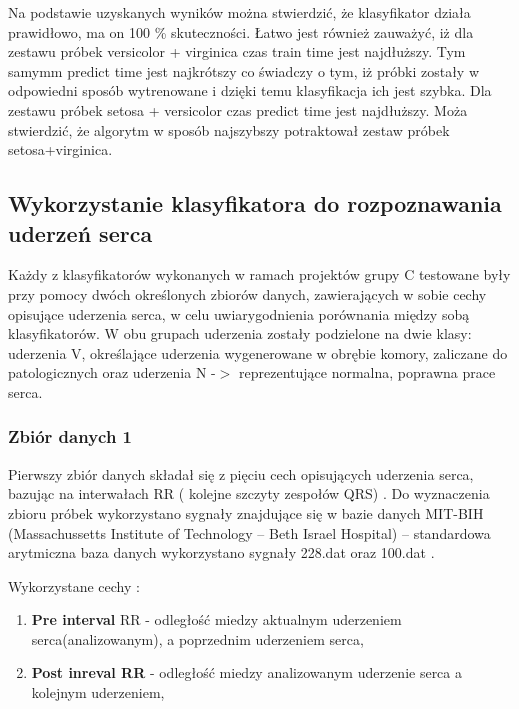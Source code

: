 \documentclass[11pt]{article}
\begin{document}
\begin{enumerate}
\noindent Na podstawie uzyskanych wyników można stwierdzić, że klasyfikator działa prawidłowo, ma on 100 \% skuteczności. Łatwo jest również zauważyć, iż dla zestawu próbek versicolor +  virginica czas train time jest najdłuższy. Tym samymm predict time jest najkrótszy co świadczy o tym, iż próbki zostały w odpowiedni sposób wytrenowane i dzięki temu klasyfikacja ich jest szybka. Dla zestawu próbek setosa + versicolor czas predict time jest najdłuższy. Moża stwierdzić, że algorytm w sposób najszybszy potraktował zestaw próbek setosa+virginica. 

\noindent 

\noindent 

\subsection{Wykorzystanie klasyfikatora do rozpoznawania uderzeń serca}

\noindent Każdy z klasyfikatorów wykonanych w ramach projektów grupy C testowane były przy pomocy dwóch określonych zbiorów danych, zawierających w sobie cechy opisujące uderzenia serca, w celu uwiarygodnienia porównania między sobą klasyfikatorów. W obu grupach uderzenia zostały podzielone na dwie klasy: uderzenia V, określające uderzenia wygenerowane w obrębie komory, zaliczane do patologicznych oraz uderzenia N -$>$ reprezentujące normalna, poprawna prace serca.

\subsubsection{ Zbiór danych 1}

\noindent Pierwszy zbiór danych składał się z pięciu cech opisujących uderzenia serca, bazując na interwałach RR ( kolejne szczyty zespołów QRS) . Do wyznaczenia zbioru próbek wykorzystano sygnały znajdujące się w bazie danych MIT-BIH (Massachussetts Institute of Technology -- Beth Israel Hospital) -- standardowa arytmiczna baza danych wykorzystano sygnały 228.dat oraz 100.dat .

\noindent Wykorzystane cechy : 

\begin{enumerate}
\item  \textbf{Pre interval} RR - odległość miedzy aktualnym uderzeniem serca(analizowanym), a poprzednim uderzeniem serca,

\item  \textbf{Post inreval RR} - odległość miedzy analizowanym uderzenie serca a kolejnym uderzeniem,


\end{enumerate}
\end{enumerate}
\end{document}

